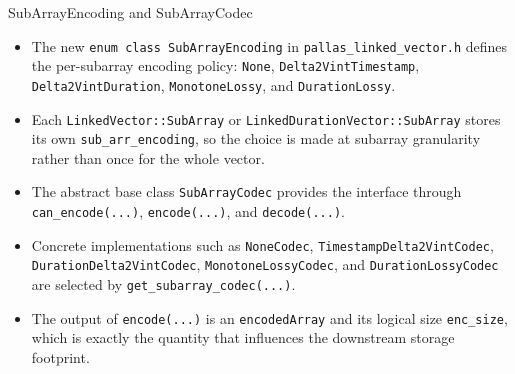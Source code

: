 \documentclass[10pt,aspectratio=169]{beamer}
\begin{document}
\begin{frame}{SubArrayEncoding and SubArrayCodec}
  \small
  \begin{itemize}
    \item<1-> The new \texttt{enum class SubArrayEncoding} in \texttt{pallas\_linked\_vector.h} defines the per-subarray encoding policy: \texttt{None}, \texttt{Delta2VintTimestamp}, \texttt{Delta2VintDuration}, \texttt{MonotoneLossy}, and \texttt{DurationLossy}.
    \item<2-> Each \texttt{LinkedVector::SubArray} or \texttt{LinkedDurationVector::SubArray} stores its own \texttt{sub\_arr\_encoding}, so the choice is made at subarray granularity rather than once for the whole vector.
    \item<3-> The abstract base class \texttt{SubArrayCodec} provides the interface through \texttt{can\_encode(...)}, \texttt{encode(...)}, and \texttt{decode(...)}.
    \item<4-> Concrete implementations such as \texttt{NoneCodec}, \texttt{TimestampDelta2VintCodec}, \texttt{DurationDelta2VintCodec}, \texttt{MonotoneLossyCodec}, and \texttt{DurationLossyCodec} are selected by \texttt{get\_subarray\_codec(...)}.
    \item<5-> The output of \texttt{encode(...)} is an \texttt{encodedArray} and its logical size \texttt{enc\_size}, which is exactly the quantity that influences the downstream storage footprint.
  \end{itemize}
\end{frame}
\end{document}
